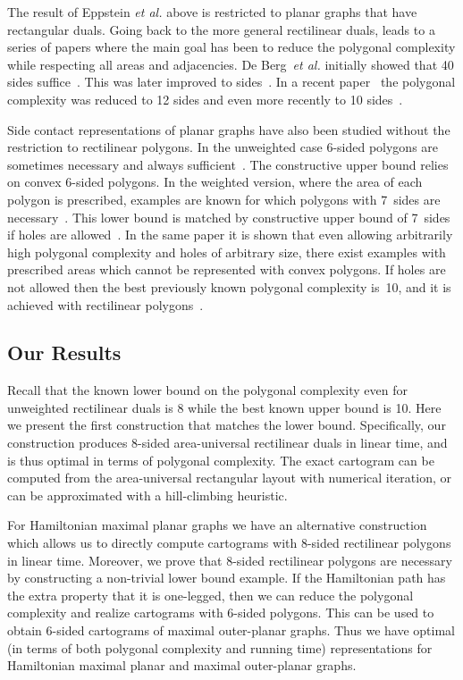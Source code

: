 \documentclass[11pt]{article}
\begin{document}
The result of Eppstein {\em et al.} above is restricted to planar
graphs that have rectangular duals. Going back to the more general
rectilinear duals, leads to a series of papers where the
main goal has been to reduce the polygonal complexity while respecting
all areas and adjacencies.
 De Berg~{\em et al.}
initially showed that 40 sides suffice~\cite{deBerg07}. This was later
improved to  sides~\cite{Nagamochi}. In a recent paper~\cite{BR-WADS11}
the polygonal
complexity was reduced to 12 sides and even more recently to 10
sides~\cite{ABFGKK11}.

Side contact representations of planar graphs have also been
studied without the restriction to rectilinear polygons. In the
unweighted case 6-sided polygons are sometimes necessary
and always sufficient~\cite{ghkk10}. The constructive upper bound relies on convex 6-sided polygons.
In the weighted version,
where the area of each polygon is prescribed, examples are known for which
polygons with 7~sides are necessary~\cite{ueck-phd}.
This lower bound is matched by constructive upper bound of 7~sides if holes are allowed~\cite{AlaBieFelKauKob11}.
In the same paper it is shown that even allowing arbitrarily high polygonal complexity and holes of
arbitrary size, there exist examples with prescribed areas which cannot be represented with convex polygons. If holes
are not allowed then the best previously known polygonal complexity is~10, and it is achieved with rectilinear polygons~\cite{ABFGKK11}.



\subsection{Our Results}

Recall that the known lower bound on the polygonal complexity even for
unweighted rectilinear duals is 8
while the best known upper
bound is 10. Here we present
the first construction that matches the lower bound.
Specifically, our construction produces 8-sided area-universal rectilinear duals
 in linear time, and is thus optimal in terms of polygonal
 complexity.  The exact cartogram can be computed from the area-universal rectangular layout with numerical iteration, or can be approximated with a hill-climbing heuristic.


For Hamiltonian maximal planar graphs we have an alternative construction
which allows us to directly compute cartograms with 8-sided rectilinear
polygons in linear time. Moreover, we prove that 8-sided rectilinear polygons
are necessary by constructing a non-trivial lower bound example.  If the
Hamiltonian path has the extra property that it is one-legged, then we can
reduce the polygonal complexity and realize cartograms with 6-sided polygons.
This can be used to obtain 6-sided cartograms of maximal outer-planar graphs.
Thus we have optimal (in terms of both polygonal complexity and running time)
representations for Hamiltonian maximal planar and maximal outer-planar
graphs.
\end{document}
